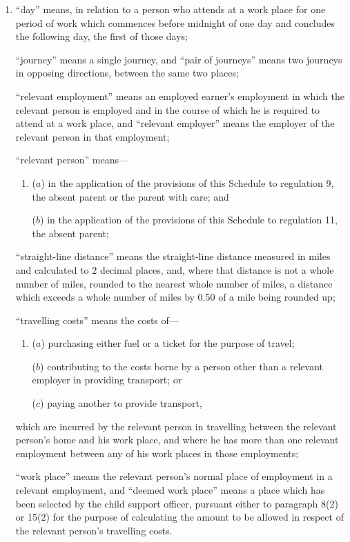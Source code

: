 \documentclass[12pt,a4paper]{article}
\begin{document}
\begin{enumerate}\item[]
“day” means, in relation to a person who attends at a work place for one period of work which commences before midnight of one day and concludes the following day, the first of those days;

“journey” means a single journey, and “pair of journeys” means two journeys in opposing directions, between the same two places;

“relevant employment” means an employed earner’s employment in which the relevant person is employed and in the course of which he is required to attend at a work place, and “relevant employer” means the employer of the relevant person in that employment;

“relevant person” means—
\begin{enumerate}\item[]
($a$) in the application of the provisions of this Schedule to regulation 9, the absent parent or the parent with care; and

($b$) in the application of the provisions of this Schedule to regulation 11, the absent parent;
\end{enumerate}

“straight-line distance” means the straight-line distance measured in miles and calculated to 2 decimal places, and, where that distance is not a whole number of miles, rounded to the nearest whole number of miles, a distance which exceeds a whole number of miles by 0.50 of a mile being rounded up;

“travelling costs” means the costs of—
\begin{enumerate}\item[]
($a$) purchasing either fuel or a ticket for the purpose of travel;

($b$) contributing to the costs borne by a person other than a relevant employer in providing transport; or

($c$) paying another to provide transport,
\end{enumerate}
which are incurred by the relevant person in travelling between the relevant person’s home and his work place, and where he has more than one relevant employment between any of his work places in those employments;

“work place” means the relevant person’s normal place of employment in a relevant employment, and “deemed work place” means a place which has been selected by the child support officer, pursuant either to paragraph 8(2) or 15(2) for the purpose of calculating the amount to be allowed in respect of the relevant person’s travelling costs.
\end{enumerate}
\end{document}
